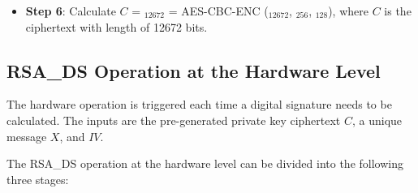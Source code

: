 \documentclass[main\_\_EN.tex]{subfiles}
\begin{document}
\begin{itemize}
    \item {\bfseries Step 6}: Calculate \begin{math}C\end{math} = \begin{math}[C]_{12672}\end{math} =
            AES-CBC-ENC (\begin{math}[P]_{12672}\end{math}, \begin{math}[RSA\_DS\_KEY]_{256}\end{math}, \begin{math}[IV]_{128}\end{math}), where \begin{math}C\end{math} is the ciphertext with length of 12672 bits.
\end{itemize}


\subsection{RSA\_DS Operation at the Hardware Level}
\label{sec:digsig-operation-at-the-hardware-level}

The hardware operation is triggered each time a digital signature needs to be calculated. The inputs are the pre-generated private key ciphertext \begin{math}C\end{math}, a unique message \begin{math}X\end{math}, and \begin{math}IV\end{math}.

The RSA\_DS operation at the hardware level can be divided into the following three stages:
\end{document}
